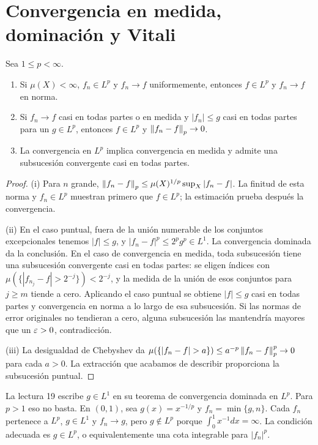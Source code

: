 \section{Convergencia en medida, dominación y Vitali}
\begin{teorema}\label{v2:lp-convergencias}
Sea $1\le p<\infty$.
\begin{enumerate}
\item Si $\mu(X)<\infty$, $f_n\in L^p$ y $f_n\to f$ uniformemente, entonces $f\in L^p$ y $f_n\to f$ en norma.
\item Si $f_n\to f$ casi en todas partes o en medida y $|f_n|\le g$ casi en todas partes para un $g\in L^p$, entonces $f\in L^p$ y $\left\lVert f_n-f\right\rVert_p\to0$.
\item La convergencia en $L^p$ implica convergencia en medida y admite una subsucesión convergente casi en todas partes.
\end{enumerate}
\end{teorema}
\begin{proof}
(i) Para $n$ grande, $\left\lVert f_n-f\right\rVert_p\le\mu(X)^{1/p}\sup_X|f_n-f|$. La finitud de esta norma y $f_n\in L^p$ muestran primero que $f\in L^p$; la estimación prueba después la convergencia.

(ii) En el caso puntual, fuera de la unión numerable de los conjuntos excepcionales tenemos $|f|\le g$, y $|f_n-f|^p\le2^p g^p\in L^1$. La convergencia dominada da la conclusión. En el caso de convergencia en medida, toda subsucesión tiene una subsucesión convergente casi en todas partes: se eligen índices con $\mu(\{|f_{n_j}-f|>2^{-j}\})<2^{-j}$, y la medida de la unión de esos conjuntos para $j\ge m$ tiende a cero. Aplicando el caso puntual se obtiene $|f|\le g$ casi en todas partes y convergencia en norma a lo largo de esa subsucesión. Si las normas de error originales no tendieran a cero, alguna subsucesión las mantendría mayores que un $\varepsilon>0$, contradicción.

(iii) La desigualdad de Chebyshev da $\mu(\{|f_n-f|>a\})\le a^{-p}\norm{f_n-f}_p^p\to0$ para cada $a>0$. La extracción que acabamos de describir proporciona la subsucesión puntual.
\end{proof}
\begin{observacion}
La lectura 19 escribe $g\in L^1$ en su teorema de convergencia dominada en $L^p$. Para $p>1$ eso no basta. En $(0,1)$, sea $g(x)=x^{-1/p}$ y $f_n=\min\{g,n\}$. Cada $f_n$ pertenece a $L^p$, $g\in L^1$ y $f_n\to g$, pero $g\notin L^p$ porque $\int_0^1x^{-1}dx=\infty$. La condición adecuada es $g\in L^p$, o equivalentemente una cota integrable para $|f_n|^p$.
\end{observacion}
